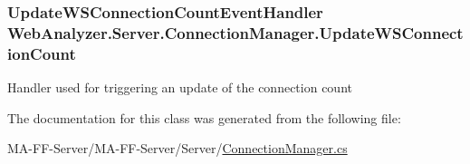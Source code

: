 \subsubsection[{Update\+W\+S\+Connection\+Count}]{\setlength{\rightskip}{0pt plus 5cm}Update\+W\+S\+Connection\+Count\+Event\+Handler Web\+Analyzer.\+Server.\+Connection\+Manager.\+Update\+W\+S\+Connection\+Count}\label{class_web_analyzer_1_1_server_1_1_connection_manager_ab583440105517709081698d731b2bdcd}


Handler used for triggering an update of the connection count 



The documentation for this class was generated from the following file\+:\begin{DoxyCompactItemize}
\item 
M\+A-\/\+F\+F-\/\+Server/\+M\+A-\/\+F\+F-\/\+Server/\+Server/\hyperlink{_connection_manager_8cs}{Connection\+Manager.\+cs}\end{DoxyCompactItemize}

